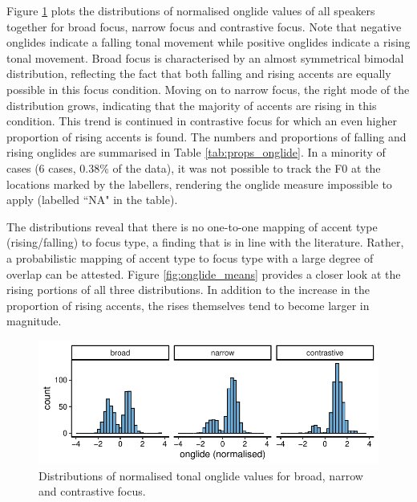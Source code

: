Figure \ref{fig:onglide_distributions_within} plots the distributions of normalised onglide values of all speakers together for broad focus, narrow focus and contrastive focus. Note that negative onglides indicate a falling tonal movement while positive onglides indicate a rising tonal movement. Broad focus is characterised by an almost symmetrical bimodal distribution, reflecting the fact that both falling and rising accents are equally possible in this focus condition. Moving on to narrow focus, the right mode of the distribution grows, indicating that the majority of accents are rising in this condition. This trend is continued in contrastive focus for which an even higher proportion of rising accents is found. The numbers and proportions of falling and rising onglides are summarised in Table \ref{tab:props_onglide}. In a minority of cases (6 cases, 0.38\% of the data), it was not possible to track the F0 at the locations marked by the labellers, rendering the onglide measure impossible to apply (labelled ``NA" in the table). 

The distributions reveal that there is no one-to-one mapping of accent type (rising/falling) to focus type, a finding that is in line with the literature. Rather, a probabilistic mapping of accent type to focus type with a large degree of overlap can be attested. Figure \ref{fig:onglide_means} provides a closer look at the rising portions of all three distributions. In addition to the increase in the proportion of rising accents, the rises themselves tend to become larger in magnitude. 

\begin{figure}
\includegraphics[width=\textwidth]{figures/ch6/onglide_norm_distribution_within.pdf}
\caption{Distributions of normalised tonal onglide values for broad, narrow and contrastive focus.}
\label{fig:onglide_distributions_within}
\end{figure}


